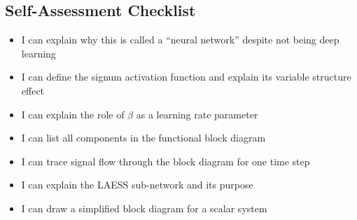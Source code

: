 \begin{largeanswer}[after upper={\vspace{72pt}}]\end{largeanswer}

\subsection*{Self-Assessment Checklist}

\begin{itemize}[leftmargin=2em, label=$\square$]
  \item I can explain why this is called a ``neural network'' despite not being deep learning
  \item I can define the signum activation function and explain its variable structure effect
  \item I can explain the role of $\beta$ as a learning rate parameter
  \item I can list all components in the functional block diagram
  \item I can trace signal flow through the block diagram for one time step
  \item I can explain the LAESS sub-network and its purpose
  \item I can draw a simplified block diagram for a scalar system
\end{itemize}

\begin{notesbox}\end{notesbox}
